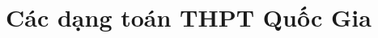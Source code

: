 

	\renewcommand{\chaptername}{Chuyên đề} %
	\tableofcontents %
	\clearpage%
\chapter{Các dạng toán THPT Quốc Gia}
%	
	

